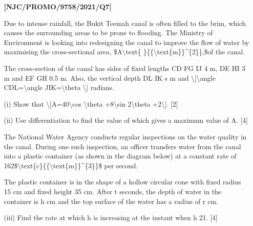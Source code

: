 \item \textbf{{[}NJC/PROMO/9758/2021/Q7{]} }

Due to intense rainfall, the Bukit Teemah canal is often filled to
the brim, which causes the surrounding areas to be prone to flooding.
The Ministry of Environment is looking into redesigning the canal
to improve the flow of water by maximising the cross-sectional area,
\$A\textbackslash text\{ \}\{\{\textbackslash text\{m\}\}\textasciicircum\{2\}\},\$of
the canal.

The cross-section of the canal has sides of fixed lengths CD FG IJ
4 m, DE HI 3 m and EF GH 0.5 m. Also, the vertical depth DL IK s m
and \textbackslash{[}\textbackslash angle CDL=\textbackslash angle
JIK=\textbackslash theta \textbackslash{]} radians. 

(i) Show that \textbackslash{[}A=40\textbackslash cos \textbackslash theta
+8\textbackslash sin 2\textbackslash theta +2\textbackslash{]}.
{[}2{]}

(ii) Use differentiation to find the value of which gives a maximum
value of A. {[}4{]}

The National Water Agency conducts regular inspections on the water
quality in the canal. During one such inspection, an officer transfers
water from the canal into a plastic container (as shown in the diagram
below) at a constant rate of 162\$\textbackslash text\{c\}\{\{\textbackslash text\{m\}\}\textasciicircum\{3\}\}\$
per second. 

The plastic container is in the shape of a hollow circular cone with
fixed radius 15 cm and fixed height 35 cm. After t seconds, the depth
of water in the container is h cm and the top surface of the water
has a radius of r cm.

(iii) Find the rate at which h is increasing at the instant when h
21. {[}4{]}